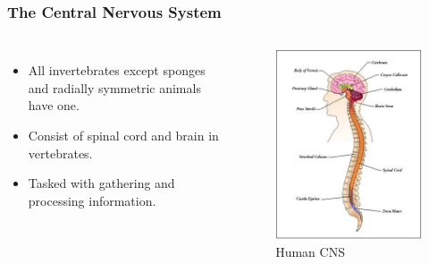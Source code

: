 \begin{frame}
 \frametitle{The Central Nervous System}
 \begin{columns}
 \begin{itemize}
  \item All invertebrates except sponges and radially symmetric animals have one.
  \item Consist of spinal cord and brain in vertebrates.
  \item Tasked with gathering and processing information.
 \end{itemize}
  \begin{figure}[H]
  \centering
  \includegraphics[scale=0.27]{figures/CNS.jpg}
  \caption{Human CNS}
  \end{figure}
 \end{columns}
\end{frame}



